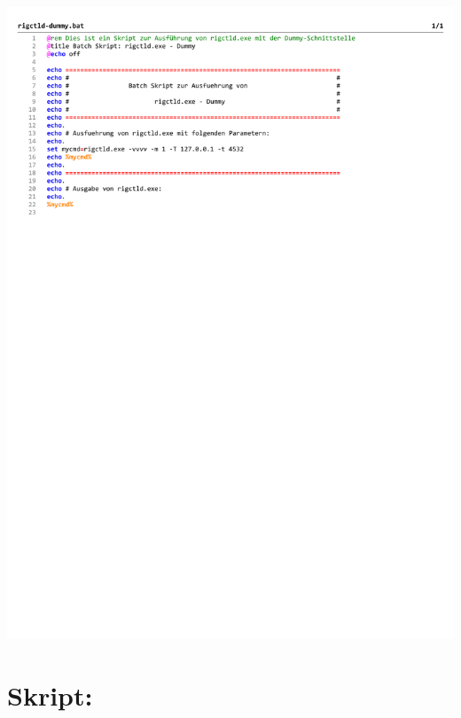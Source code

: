 \begin{center}
	\includegraphics[width=1\textwidth]{./appendicies/rigctld-dummy}
\end{center}


\chapter{Skript: }
\label{chap:rotctlddummybat}


